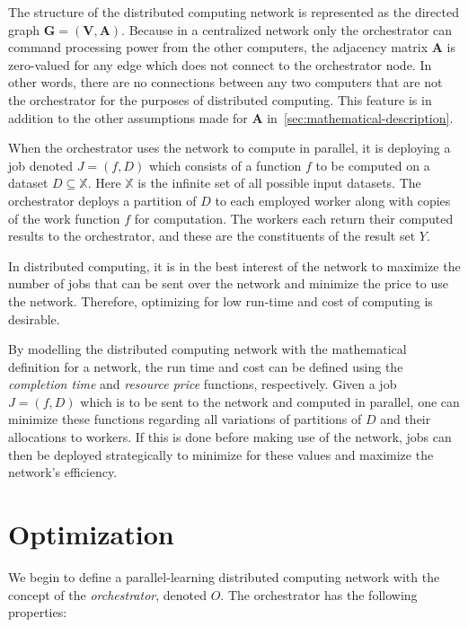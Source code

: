 \documentclass[../mthe-493-final-project.tex]{subfiles}
\begin{document}
    The structure of the distributed computing network is represented as the directed graph $\mathbf{G} = (\mathbf{V}, \mathbf{A})$. Because in a centralized network only the orchestrator can command processing power from the other computers, the adjacency matrix $\mathbf{A}$ is zero-valued for any edge which does not connect to the orchestrator node. In other words, there are no connections between any two computers that are not the orchestrator for the purposes of distributed computing. This feature is in addition to the other assumptions made for $\mathbf{A}$ in~\autoref{sec:mathematical-description}.

    When the orchestrator uses the network to compute in parallel, it is deploying a job denoted $J = (f,D)$ which consists of a function $f$ to be computed on a dataset $D \subseteq \mathbb{X}$. Here $\mathbb{X}$ is the infinite set of all possible input datasets. The orchestrator deploys a partition of $D$ to each employed worker along with copies of the work function $f$ for computation. The workers each return their computed results to the orchestrator, and these are the constituents of the result set $Y$.

    In distributed computing, it is in the best interest of the network to maximize the number of jobs that can be sent over the network and minimize the price to use the network. Therefore, optimizing for low run-time and cost of computing is desirable.

    By modelling the distributed computing network with the mathematical definition for a network, the run time and cost can be defined using the \textit{completion time} and \textit{resource price} functions, respectively. Given a job $J = (f,D)$ which is to be sent to the network and computed in parallel, one can minimize these functions regarding all variations of partitions of $D$ and their allocations to workers. If this is done before making use of the network, jobs can then be deployed strategically to minimize for these values and maximize the network's efficiency.

    \section{Optimization}
    \label{sec:optimization-problem-description}

    We begin to define a parallel-learning distributed computing network with the concept of the \textit{orchestrator}, denoted $O$. The orchestrator has the following properties:
\end{document}

